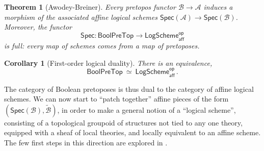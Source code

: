\documentclass[12pt]{article}
\newtheorem*{theorem*}{Theorem}
\newtheorem*{corollary*}{Corollary}
\theoremstyle{remark}
\theoremstyle{definition}
\begin{document}

\begin{theorem*}[Awodey-Breiner]
Every pretopos functor $\mathcal{B} \to \mathcal{A}$ induces a morphism of the associated affine logical schemes $\mathsf{Spec}(\mathcal{A}) \to \mathsf{Spec}(\mathcal{B})$.  Moreover, the  functor
\[
\mathsf{Spec} : \mathsf{BoolPreTop} \longrightarrow \mathsf{LogScheme}^{\mathsf{op}}_{\mathsf{aff}}
\]
is \emph{full}: every map of schemes comes from a map of pretoposes.
\end{theorem*}

\begin{corollary*}[First-order logical duality]
There is an equivalence,
\[
\mathsf{BoolPreTop} \ \simeq\ \mathsf{LogScheme}^{\mathsf{op}}_{\mathsf{aff}}\,.
\]
\end{corollary*}

The category of Boolean pretoposes is thus dual to the category of affine logical schemes.  We can now start to  ``patch together'' affine pieces of the form $(\mathsf{Spec}(\mathcal{B}),\widetilde{\mathcal{B}})$, in order to make a general notion of a ``logical scheme'', consisting of a topological groupoid of structures not tied to any one theory, equipped with a sheaf of local theories, and locally equivalent to an affine scheme.  The few first steps in this direction are explored in \cite{B}.


\end{document}

